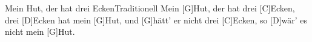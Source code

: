 \documentclass[../main.tex]{subfiles}
\begin{document}
\begin{song}{Mein Hut, der hat drei Ecken}{Traditionell}{}
Mein [G]Hut, der hat drei [C]Ecken, drei [D]Ecken hat mein [G]Hut,
und [G]hätt' er nicht drei [C]Ecken, so [D]wär' es nicht mein [G]Hut.
\end{song}
\end{document}
